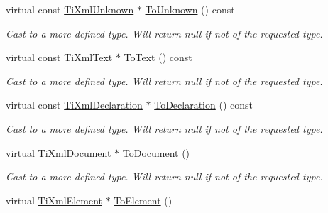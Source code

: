 \begin{DoxyCompactItemize}
\mbox{\label{class_ti_xml_node_ab4f2e6ce87d36c1b9b7de2529128a460}} 
virtual const \hyperlink{class_ti_xml_unknown}{Ti\+Xml\+Unknown} $\ast$ \hyperlink{class_ti_xml_node_ab4f2e6ce87d36c1b9b7de2529128a460}{To\+Unknown} () const
\begin{DoxyCompactList}\small\item\em Cast to a more defined type. Will return null if not of the requested type. \end{DoxyCompactList}\item 
\mbox{\label{class_ti_xml_node_a2591700660b308571c09166559a39332}} 
virtual const \hyperlink{class_ti_xml_text}{Ti\+Xml\+Text} $\ast$ \hyperlink{class_ti_xml_node_a2591700660b308571c09166559a39332}{To\+Text} () const
\begin{DoxyCompactList}\small\item\em Cast to a more defined type. Will return null if not of the requested type. \end{DoxyCompactList}\item 
\mbox{\label{class_ti_xml_node_a0dc0831e89d499ca911a3be61a413d45}} 
virtual const \hyperlink{class_ti_xml_declaration}{Ti\+Xml\+Declaration} $\ast$ \hyperlink{class_ti_xml_node_a0dc0831e89d499ca911a3be61a413d45}{To\+Declaration} () const
\begin{DoxyCompactList}\small\item\em Cast to a more defined type. Will return null if not of the requested type. \end{DoxyCompactList}\item 
\mbox{\label{class_ti_xml_node_a6a4c8ac28ee7a745d059db6691e03bae}} 
virtual \hyperlink{class_ti_xml_document}{Ti\+Xml\+Document} $\ast$ \hyperlink{class_ti_xml_node_a6a4c8ac28ee7a745d059db6691e03bae}{To\+Document} ()
\begin{DoxyCompactList}\small\item\em Cast to a more defined type. Will return null if not of the requested type. \end{DoxyCompactList}\item 
\mbox{\label{class_ti_xml_node_aa65d000223187d22a4dcebd7479e9ebc}} 
virtual \hyperlink{class_ti_xml_element}{Ti\+Xml\+Element} $\ast$ \hyperlink{class_ti_xml_node_aa65d000223187d22a4dcebd7479e9ebc}{To\+Element} ()

\end{DoxyCompactItemize}
